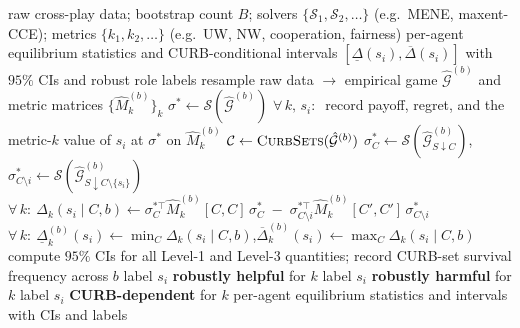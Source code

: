 \documentclass[sigconf,anonymous]{aamas}
\begin{document}
\begin{algorithm*}[t]
\caption{Counterfactual Meta-Game Analysis (bootstrap, multi-solver, multi-metric)}
\label{alg:cmga}
\begin{algorithmic}[1]
\Require raw cross-play data; bootstrap count $B$; solvers $\{\mathcal{S}_1,\mathcal{S}_2,\dots\}$ (e.g.\ MENE, maxent-CCE); metrics $\{k_1,k_2,\dots\}$ (e.g.\ UW, NW, cooperation, fairness)
\Ensure per-agent equilibrium statistics and CURB-conditional intervals $[\underline{\Delta}(s_i),\overline{\Delta}(s_i)]$ with $95\%$ CIs and robust role labels
\Statex
{}
  \State resample raw data $\rightarrow$ empirical game $\hat{\mathcal{G}}^{(b)}$ and metric matrices $\{\hat{M}^{(b)}_k\}_k$
  \Statex
    \State $\sigma^{*} \gets \mathcal{S}(\hat{\mathcal{G}}^{(b)})$
    \State $\forall\,k,\,s_i:\ $ record payoff, regret, and the metric-$k$ value of $s_i$ at $\sigma^{*}$ on $\hat{M}^{(b)}_k$
  \EndFor
  \Statex
  \State $\mathcal{C} \gets \textsc{CurbSets}(\hat{\mathcal{G}}^{(b)})$ 
      \State $\sigma^{*}_C \gets \mathcal{S}(\hat{\mathcal{G}}^{(b)}_{S\downarrow C})$,\quad $\sigma^{*}_{C\setminus i} \gets \mathcal{S}(\hat{\mathcal{G}}^{(b)}_{S\downarrow C\setminus\{s_i\}})$
      \State $\forall\,k:\ \Delta_k(s_i\mid C,b) \gets \sigma_C^{*\top}\hat{M}^{(b)}_k[C,C]\,\sigma^{*}_C \;-\; \sigma_{C\setminus i}^{*\top}\hat{M}^{(b)}_k[C',C']\,\sigma^{*}_{C\setminus i}$ 
    \EndFor
    \State $\forall\,k:\ \underline{\Delta}^{(b)}_k(s_i) \gets \min_{C}\Delta_k(s_i\mid C,b)$,\quad $\overline{\Delta}^{(b)}_k(s_i) \gets \max_{C}\Delta_k(s_i\mid C,b)$
  \EndFor
\EndFor
\Statex
{}
\State compute $95\%$ CIs for all Level-1 and Level-3 quantities; record CURB-set survival frequency across $b$
   \State label $s_i$ \textbf{robustly helpful} for $k$
   \State label $s_i$ \textbf{robustly harmful} for $k$
  \Else{} \State label $s_i$ \textbf{CURB-dependent} for $k$
  \EndIf
\EndFor
\State \Return per-agent equilibrium statistics and intervals with CIs and labels 
\end{algorithmic}
\end{algorithm*}
\end{document}
